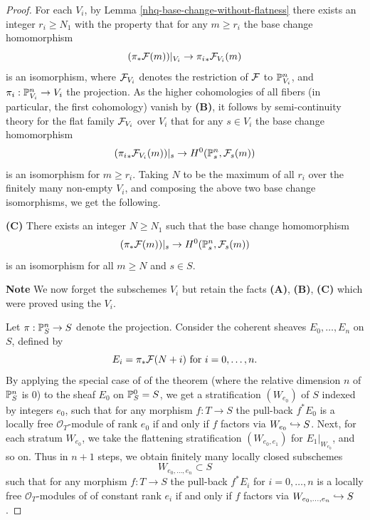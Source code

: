 \begin{proof}
For each $V_i$, by Lemma \ref{nhq-base-change-without-flatness}
there exists an
integer $r_i \ge N_1$ with the property
that for any $m\ge r_i$ the base change homomorphism
$$(\pi_*\mathcal{F}(m))|_{V_i} \to {\pi_i}_*\mathcal{F}_{V_i}(m)$$
is an isomorphism, where $\mathcal{F}_{V_i}$ denotes the restriction of
$\mathcal{F}$ to $\mathbb{P}^n_{V_i}$, and $\pi_i : \mathbb{P}^n_{V_i}\to V_i$ the projection.
As the higher cohomologies of all fibers (in particular, the first
cohomology) vanish by \textbf{(B)},
it follows by semi-continuity theory for the flat family $\mathcal{F}_{V_i}$
over $V_i$ that for any $s\in V_i$
the base change homomorphism
$$({\pi_i}_*\mathcal{F}_{V_i}(m))|_s \to  H^0(\mathbb{P}^n_s,\mathcal{F}_s(m))$$
is an isomorphism for $m\ge r_i$. Taking $N$ to be the maximum of
all $r_i$ over the finitely many non-empty $V_i$, and composing the
above two base change isomorphisms, we get the following.


\medskip

\begin{claim}\label{nhq-base-change-direct-image}
\textbf{(C) } There exists an integer $N \ge N_1$ such that
the base change homomorphism
$$(\pi_*\mathcal{F}(m))|_s \to  H^0(\mathbb{P}^n_s,\mathcal{F}_s(m))$$
is an isomorphism for all $m\ge N$ and $s\in S$.



\end{claim}
\medskip


\textbf{Note } We now forget the subschemes $V_i$ but retain the facts
\textbf{(A)},
\textbf{(B)},
\textbf{(C)}
which were proved using the $V_i$.

\medskip


Let $\pi : \mathbb{P}^n_S \to S$ denote the projection. Consider the
coherent sheaves $E_0, \ldots, E_n$ on $S$, defined by
$$E_i = \pi_*\mathcal{F}(N+i)\mbox{ for } i=0,\ldots,n.$$
By applying the special case of of the theorem (where the relative dimension
$n$ of $\mathbb{P}^n_S$ is $0$) to the sheaf $E_0$ on $\mathbb{P}^0_S=S$, we get
a stratification $(W_{e_0})$ of $S$
indexed by integers $e_0$, such that for any morphism
$f: T\to S$ the pull-back $f^*E_0$ is a locally free ${\mathcal O}_T$-module
of rank $e_0$ if and only if $f$ factors via $W_{e_0} \hookrightarrow S$.
Next, for each stratum $W_{e_0}$, we take the
flattening stratification $(W_{e_0,e_1})$ for $E_1|_{W_{e_0}}$, and so on.
Thus in $n+1$ steps, we obtain finitely many
locally closed subschemes
$$W_{e_0,\ldots,e_n} \subset S$$
such that for any morphism $f:T\to S$ the pull-back
$f^*E_i$ for $i=0,\ldots,n$ is a locally free ${\mathcal O}_T$-modules of
of constant rank $e_i$ if and only if $f$ factors
via $W_{e_0,\ldots,e_n} \hookrightarrow S$.




\end{proof}
